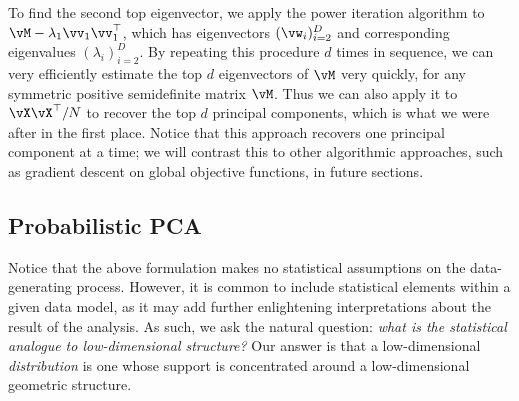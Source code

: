 \documentclass[../../book-main.tex]{subfiles}
\begin{document}

To find the second top eigenvector, we apply the power iteration algorithm to \(\vM - \lambda_{1}\vv_{1}\vv_{1}^{\top}\), which has eigenvectors \((\vw_{i})_{i = 2}^{D}\) and corresponding eigenvalues \((\lambda_{i})_{i = 2}^{D}\). By repeating this procedure \(d\) times in sequence, we can very efficiently estimate the top \(d\) eigenvectors of \(\vM\) very quickly, for any symmetric positive semidefinite matrix \(\vM\). Thus we can also apply it to \(\vX\vX^{\top}/N\) to recover the top \(d\) principal components, which is what we were after in the first place. Notice that this approach recovers one principal component at a time; we will contrast this to other algorithmic approaches, such as gradient descent on global objective functions, in future sections.





\subsection{Probabilistic PCA}\label{subsec:probabilistic PCA}

Notice that the above formulation makes no statistical assumptions on the
data-generating process. However, it is common to include statistical elements
within a given data model, as it may add further enlightening interpretations
about the result of the analysis. As such, we ask the natural question:
\textit{what is the statistical analogue to low-dimensional structure?} Our answer is that a low-dimensional \textit{distribution} is one whose support is concentrated around a low-dimensional geometric structure. 
\end{document}
